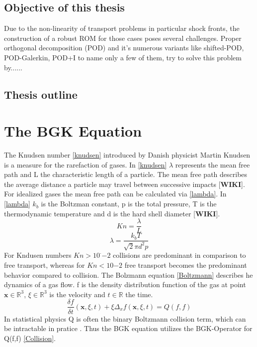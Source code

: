 \documentclass[12pt, a4paper]{article}
\begin{document}
\subsection{Objective of this thesis}
Due to the non-linearity of transport problems in particular shock fronts, the construction of a robust ROM for those cases poses several challenges. Proper orthogonal decomposition (POD) and it's numerous variants like shifted-POD\cite{bibid}, POD-Galerkin\cite{bibid}, POD+I \cite{bibid} to name only a few of them, try to solve this problem by......
\subsection{Thesis outline}
\section{The BGK Equation}
The Knudsen number \cref{knudsen} introduced by Danish physicist Martin Knudsen is a measure for the rarefaction of gases. In \cref{knudsen} $\lambda$ represents the mean free path and L the characteristic length \cite{Bernard} of a particle. The mean free path  describes the average distance a particle may travel between successive impacts [\textbf{WIKI}]. For idealized gases the mean free path can be calculated via \cref{lambda}. In \cref{lambda} $k_b$ is the Boltzman constant, p is the total pressure, T is the thermodynamic temperature and d is the hard shell diameter [\textbf{WIKI}]. 
\begin{equation}
	Kn = \frac{\lambda}{L}
	\label{knudsen}
\end{equation}
\begin{equation}
	\lambda = \frac{k_bT}{\sqrt{2}\pi d^2p}
	\label{lambda}
\end{equation}
For Kndusen numbers $Kn > 10^·{-2}$ collisions are predominant in comparison to free transport, whereas for $Kn < 10{-2}$ free transport becomes the predominant behavior compared to collision\cite{Bernard}. The Bolzmann equation \cref{Boltzmann} describes he dynamics of a gas flow. f is the density distribution function of the gas at point $\textbf{x} \in \mathbb{R}^3$, $\xi \in \mathbb{R}^3$ is the velocity and $t \in \mathbb{R}$ the  time.
\begin{equation}
	\frac{\delta f}{\delta t}(\textbf{x}, \xi, t) + \xi \Delta_x f(\textbf{x},\xi,t) = Q(f,f)
	\label{Boltzmann}
\end{equation}
In statistical physics Q is often the binary Boltzmann collision term, which can be intractable in pratice \cite{BGK}. Thus the BGK equation utilizes the BGK-Operator for Q(f,f) \cref{Collision}\cite{Bernard}.
\end{document}
